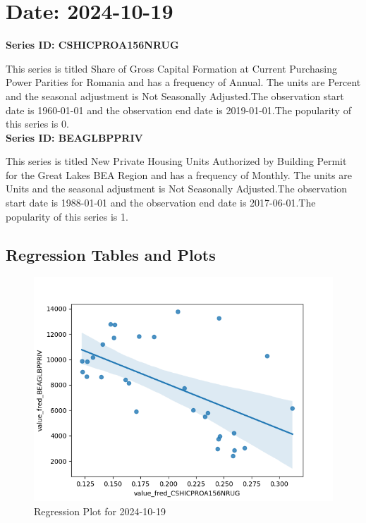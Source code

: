 \section{Date: 2024-10-19}
\noindent \textbf{Series ID: CSHICPROA156NRUG} 

\noindent This series is titled Share of Gross Capital Formation at Current Purchasing Power Parities for Romania and has a frequency of Annual. The units are Percent and the seasonal adjustment is Not Seasonally Adjusted.The observation start date is 1960-01-01 and the observation end date is 2019-01-01.The popularity of this series is 0. \\ 

\noindent \textbf{Series ID: BEAGLBPPRIV} 

\noindent This series is titled New Private Housing Units Authorized by Building Permit for the Great Lakes BEA Region and has a frequency of Monthly. The units are Units and the seasonal adjustment is Not Seasonally Adjusted.The observation start date is 1988-01-01 and the observation end date is 2017-06-01.The popularity of this series is 1. \\ 

\subsection{Regression Tables and Plots}


\begin{figure}
\centering
\includegraphics[scale = 0.9]{plots/plot_2024-10-19.png}
\caption{Regression Plot for 2024-10-19}
\end{figure}
\newpage
